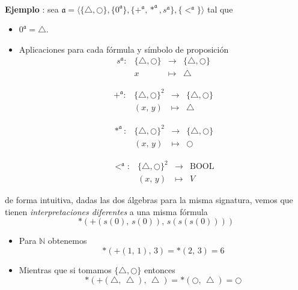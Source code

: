 \paragraph{}
\addtocounter{ej}{1} %
\textbf{Ejemplo }: sea $\mathfrak{a} = \langle \{\bigtriangleup, \bigcirc \}, \{0^{\mathfrak{a}}\}, \{+^{\mathfrak{a}}, *^{\mathfrak{a}}, s^{\mathfrak{a}}\}, \{<^{\mathfrak{a}}\}\rangle$ tal que
\begin{itemize}
    \item $0^{\mathfrak{a}} = \bigtriangleup$.
    \item Aplicaciones para cada fórmula y símbolo de proposición 
\[ \begin{matrix}
s^{\mathfrak{a}}:&\{\bigtriangleup, \bigcirc \}& \rightarrow & \{\bigtriangleup, \bigcirc \}\\
&x&\mapsto& \bigtriangleup
\end{matrix} \]

\[ \begin{matrix}
+^{\mathfrak{a}}:&\{\bigtriangleup, \bigcirc \}^2& \rightarrow & \{\bigtriangleup, \bigcirc \}\\
&(x,\,y)&\mapsto&  \bigtriangleup
\end{matrix} \] 

\[ \begin{matrix}
\ast^{\mathfrak{a}} : &\{\bigtriangleup, \bigcirc \}^2& \rightarrow & \{\bigtriangleup, \bigcirc \}\\
&(x, \, y)&\mapsto& \bigcirc 
\end{matrix} \]

\[ \begin{matrix}
<^{\mathfrak{a}}:&\{\bigtriangleup, \bigcirc \}^2& \rightarrow & \mbox{BOOL} \\
&(x, \, y)&\mapsto& V
\end{matrix} \] 
   \end{itemize} 
de forma intuitiva, dadas las dos álgebras para la misma signatura, vemos que tienen \textit{interpretaciones diferentes} a una misma fórmula 
\[ \ast(+(s(0),\,s(0)),\,s(s(s(0)))) \]
\begin{itemize}
	\item Para $\mathbb{N}$ obtenemos 
	\[ \ast(+(1,\,1),\,3)= \ast(2,\,3)=6 \]
	\item Mientras que si tomamos $\{\bigtriangleup, \bigcirc \}$ entonces
		\[ \ast(+(\bigtriangleup,\,\bigtriangleup),\,\bigtriangleup)= \ast(\bigcirc,\,\bigtriangleup)=\bigcirc \] 
\end{itemize} 

